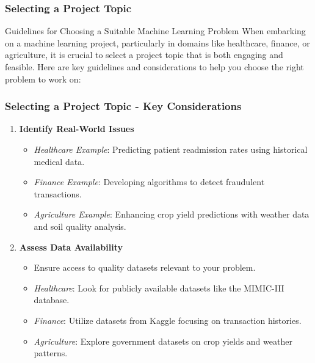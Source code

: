 \documentclass[aspectratio=169]{beamer}
\begin{document}
\begin{frame}[fragile]
    \frametitle{Selecting a Project Topic}
    \begin{block}{Guidelines for Choosing a Suitable Machine Learning Problem}
        When embarking on a machine learning project, particularly in domains like healthcare, finance, or agriculture, it is crucial to select a project topic that is both engaging and feasible. Here are key guidelines and considerations to help you choose the right problem to work on:
    \end{block}
\end{frame}

\begin{frame}[fragile]
    \frametitle{Selecting a Project Topic - Key Considerations}
    \begin{enumerate}
        \item \textbf{Identify Real-World Issues}
        \begin{itemize}
            \item \textit{Healthcare Example}: Predicting patient readmission rates using historical medical data.
            \item \textit{Finance Example}: Developing algorithms to detect fraudulent transactions.
            \item \textit{Agriculture Example}: Enhancing crop yield predictions with weather data and soil quality analysis.
        \end{itemize}

        \item \textbf{Assess Data Availability}
        \begin{itemize}
            \item Ensure access to quality datasets relevant to your problem.
            \item \textit{Healthcare}: Look for publicly available datasets like the MIMIC-III database.
            \item \textit{Finance}: Utilize datasets from Kaggle focusing on transaction histories.
            \item \textit{Agriculture}: Explore government datasets on crop yields and weather patterns.
        \end{itemize}
    \end{enumerate}
\end{frame}
\end{document}
